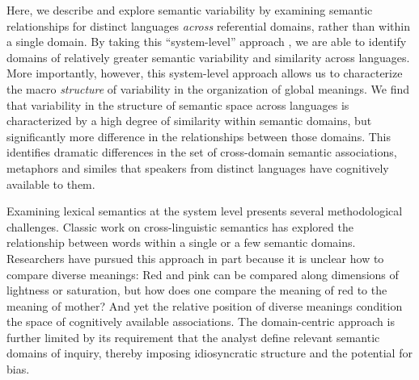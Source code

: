 \documentclass[9pt,twocolumn,twoside,lineno]{pnas-new}
\begin{document}
Here, we describe and explore semantic variability by examining semantic relationships for distinct languages \textit{across} referential domains, rather than within a single domain. By taking this ``system-level'' approach \cite{saussure, levi2008structural}, we are able to identify domains of relatively greater semantic variability and similarity across languages. More importantly, however, this system-level approach allows us to characterize the macro {\it structure} of variability in the organization of global meanings. We find that variability in the structure of semantic space across languages is characterized by a high degree of similarity within semantic domains, but significantly more difference in the relationships between those domains. This identifies dramatic differences in the set of cross-domain semantic associations, metaphors and similes that speakers from distinct languages have cognitively available to them. 

Examining lexical semantics at the system level presents several methodological challenges. Classic work on cross-linguistic semantics has explored the relationship between words within a single \cite{berlin1991basic,regier2007color,baddeley2009} or a few \cite{thompson2020cultural} semantic domains. Researchers have pursued this approach in part because it is unclear how to compare diverse meanings: Red and pink can be compared along dimensions of lightness or saturation, but how does one compare the meaning of red to the meaning of mother? And yet the relative position of diverse meanings condition the space of cognitively available associations. The domain-centric approach is further limited by its requirement that the analyst define relevant semantic domains of inquiry, thereby imposing idiosyncratic structure and the potential for bias.
\end{document}
